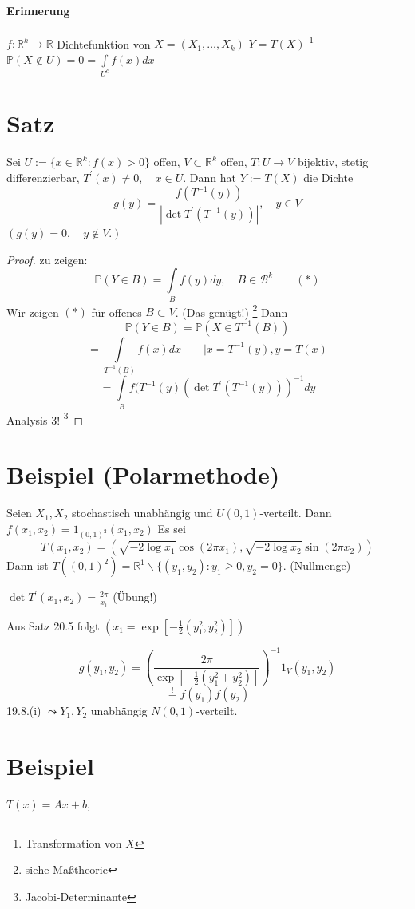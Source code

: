 \documentclass[a4paper,11pt,notitlepage]{report}
\newcommand{\R}{{\ensuremath{\mathbb{R}}}}
\newcommand{\Prim}{{\ensuremath{\mathbb{P}}}}
\begin{document}
\paragraph{Erinnerung}
$f \colon \R^k \rightarrow \R$ Dichtefunktion von $X = (X_1, \ldots, X_k)$
\newline
$Y=T(X)$ \footnote{Transformation von $X$}
\newline
$\Prim(X \notin U) = 0 = \int\limits_{U^c}{f(x) dx}$
\section{Satz}
Sei $U:= \{x \in \R^k \colon f(x) > 0 \}$ offen, $V \subset \R^k$ offen, $T \colon U \rightarrow V$ bijektiv, stetig differenzierbar,
$T^\prime(x) \neq 0, \quad x \in U$. Dann hat $Y:=T(X)$ die Dichte
$$g(y) = \frac{f(T^{-1}(y))}{|\det T^{\prime}(T^{-1}(y))|}, \quad y \in V$$
$(g(y) = 0, \quad y \notin V.)$

\begin{proof}
zu zeigen:
$$\Prim(Y \in B) = \int\limits_B{f(y) dy, \quad B \in \mathcal{B}^k} \qquad (*)$$
Wir zeigen $(*)$ für offenes $B \subset V$. (Das genügt!) \footnote{siehe Maßtheorie} Dann
$$\Prim(Y \in B) = \Prim(X \in T^{-1}(B))$$
$$= \int\limits_{T^{-1}(B)}{f(x) dx} \qquad | x = T^{-1}(y), y = T(x)$$
$$= \int\limits_B{f(T^{-1}(y) \left(\det T^\prime(T^{-1}(y))\right)^{-1} dy}$$
Analysis 3! \footnote{Jacobi-Determinante}
\end{proof}

\section{Beispiel (Polarmethode)}
Seien $X_1, X_2$ stochastisch unabhängig und $U(0,1)$-verteilt.
Dann $f(x_1, x_2) = 1_{(0,1)^2}(x_1, x_2)$
Es sei 
$$T(x_1, x_2) = (\sqrt{-2 \log x_1} \cos(2 \pi x_1), \sqrt{-2 \log x_2} \sin(2 \pi x_2))$$
Dann ist $T((0,1)^2) = \R^1 \backslash \{(y_1, y_2) \colon y_1 \geq 0, y_2 = 0 \}.$ (Nullmenge)

$\det T^\prime(x_1, x_2) = \frac{2\pi}{x_1}$ (Übung!)

Aus Satz 20.5 folgt $(x_1 = \exp [-\frac{1}{2}(y_1^2, y_2^2)])$

$$g(y_1, y_2) = (\frac{2 \pi}{\exp [- \frac{1}{2} (y_1^2 + y_2^2)]})^{-1} 1_V(y_1,y_2)$$
$$\overset{!}{=} f(y_1) f(y_2)$$
19.8.(i) $\leadsto Y_1, Y_2$ unabhängig $N(0,1)$-verteilt.

\section{Beispiel}
$T(x) = Ax + b$,
\end{document}
